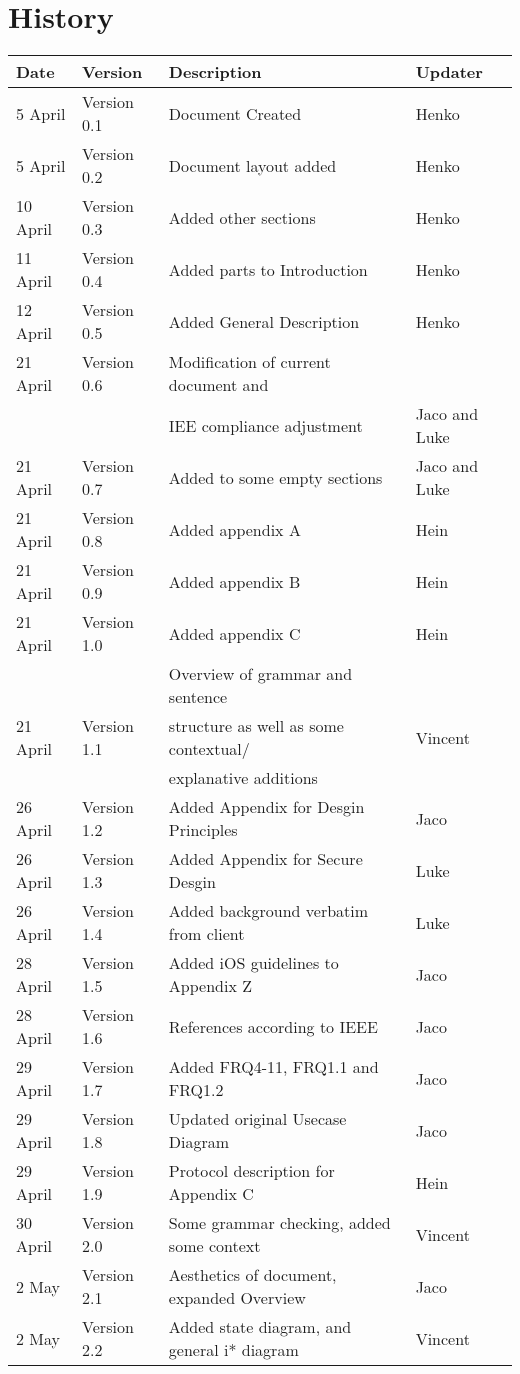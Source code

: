 
\section{History}

\begin{center}

\begin{tabular}{|l|l|l|l|}

\hline
\textbf{Date} & \textbf{Version} & \textbf{Description}&\textbf{Updater}\\ 
\hline
5 April& Version 0.1 & Document Created&Henko\\ 
\hline
5 April& Version 0.2 & Document layout added&Henko\\ 
\hline
10 April & Version 0.3 & Added other sections&Henko\\ 
\hline
11 April & Version 0.4 & Added parts to Introduction&Henko\\ 
\hline
12 April & Version 0.5 & Added General Description&Henko\\ 
\hline
21 April & Version 0.6 & Modification of current document and&\\
&& IEE compliance adjustment&Jaco and Luke\\ 
\hline
21 April & Version 0.7 & Added to some empty sections &Jaco and Luke\\ 
\hline
21 April & Version 0.8 & Added appendix A&Hein\\ 
\hline
21 April & Version 0.9 & Added appendix B&Hein\\ 
\hline
21 April & Version 1.0 & Added appendix C&Hein\\ 
\hline
			&& Overview of grammar and sentence&\\ 
21 April & Version 1.1& structure as well as some contextual/&Vincent\\
			&&explanative additions & \\
\hline
26 April & Version 1.2 & Added Appendix for Desgin Principles& Jaco\\
\hline
26 April & Version 1.3 & Added Appendix for Secure Desgin& Luke\\
\hline
26 April & Version 1.4 & Added background verbatim from client& Luke\\
\hline
28 April & Version 1.5 & Added iOS guidelines to Appendix Z& Jaco\\
\hline
28 April & Version 1.6 & References according to IEEE& Jaco\\
\hline
29 April & Version 1.7 & Added FRQ4-11, FRQ1.1 and FRQ1.2& Jaco\\
\hline
29 April & Version 1.8 & Updated original Usecase Diagram& Jaco\\
\hline
29 April & Version 1.9 & Protocol description for Appendix C& Hein\\
\hline
30 April & Version 2.0 & Some grammar checking, added some context & Vincent\\
\hline
2 May & Version 2.1 & Aesthetics of document, expanded Overview& Jaco\\
\hline
2 May & Version 2.2 & Added state diagram, and general i* diagram & Vincent\\
\hline
\end{tabular}


\end{center}
